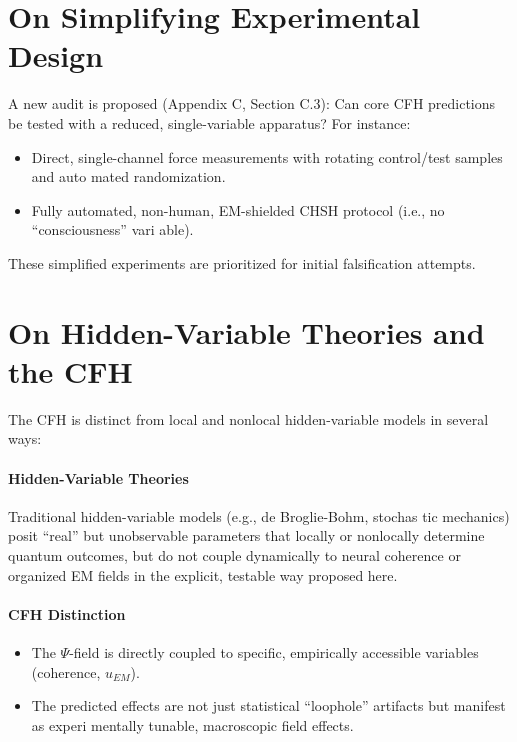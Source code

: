 \documentclass{report}
\begin{document}
\section{On Simplifying Experimental Design}
\label{sec:simplifying_design_cfh_main}

A new audit is proposed (Appendix C, Section C.3): Can core CFH predictions be tested with
a reduced, single-variable apparatus? For instance: %
\begin{itemize}
    \item Direct, single-channel force measurements with rotating control/test samples and auto mated randomization.
    \item Fully automated, non-human, EM-shielded CHSH protocol (i.e., no “consciousness” vari able).
\end{itemize}
These simplified experiments are prioritized for initial falsification attempts.

\section{On Hidden-Variable Theories and the CFH}
\label{sec:hidden_variables_cfh_main}

The CFH is distinct from local and nonlocal hidden-variable models in several ways:

\paragraph{Hidden-Variable Theories}
Traditional hidden-variable models (e.g., de Broglie-Bohm, stochas tic mechanics) posit “real” but unobservable parameters that locally or nonlocally determine
quantum outcomes, but do not couple dynamically to neural coherence or organized EM fields
in the explicit, testable way proposed here.

\paragraph{CFH Distinction}
\begin{itemize}
    \item The $\Psi$-field is directly coupled to specific, empirically accessible variables (coherence, $u_{EM}$).
    \item The predicted effects are not just statistical “loophole” artifacts but manifest as experi mentally tunable, macroscopic field effects.
\end{itemize}
\end{document}
